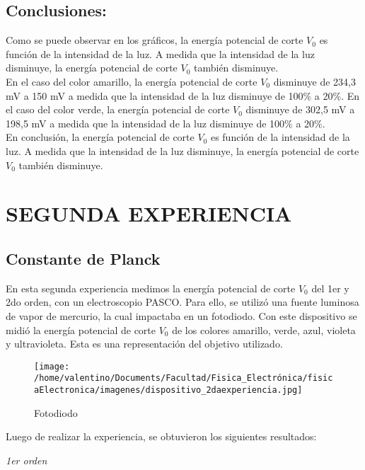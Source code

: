\documentclass[a4paper]{article}
\begin{document}
        \subsection{Conclusiones:}
        \indent Como se puede observar en los gráficos, la energía potencial de corte $V_{0}$ es función de la intensidad de la luz. A medida que la intensidad de la luz disminuye, la energía potencial de corte $V_{0}$ también disminuye.\\
        \indent En el caso del color amarillo, la energía potencial de corte $V_{0}$ disminuye de 234,3 mV a 150 mV a medida que la intensidad de la luz disminuye de 100$\%$ a 20$\%$. En el caso del color verde, la energía potencial de corte $V_{0}$ disminuye de 302,5 mV a 198,5 mV a medida que la intensidad de la luz disminuye de 100$\%$ a 20$\%$.\\
        \indent En conclusión, la energía potencial de corte $V_{0}$ es función de la intensidad de la luz. A medida que la intensidad de la luz disminuye, la energía potencial de corte $V_{0}$ también disminuye.\\

    \section{SEGUNDA EXPERIENCIA}
      \subsection{Constante de Planck}
      \indent En esta segunda experiencia medimos la energía potencial de corte $V_{0}$ del 1er y 2do orden, con un electroscopio PASCO. Para ello, se utilizó una fuente luminosa de vapor de mercurio, la cual impactaba en un fotodiodo. Con este dispositivo se midió la energía potencial de corte $V_{0}$ de los colores amarillo, verde, azul, violeta y ultravioleta. Esta es una representación del objetivo utilizado.
      \vspace{0mm}

      \begin{figure}[h]
        \centering
        \texttt{[image: /home/valentino/Documents/Facultad/Fisica\_Electrónica/fisicaElectronica/imagenes/dispositivo\_2daexperiencia.jpg]}
        \caption{Fotodiodo}
      \end{figure}

      \indent Luego de realizar la experiencia, se obtuvieron los siguientes resultados:

      \begin{minipage}[c]{7.5cm}
        \vspace{5mm}
        \centering
        \textit{1er orden} 
        \vspace{2mm}
      \end{minipage}
\end{document}
